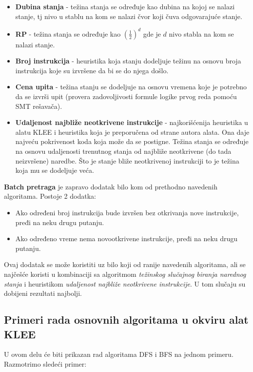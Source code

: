 \documentclass[12pt]{article}
\begin{document}
\begin{itemize}
    \item\textbf{Dubina stanja} - težina stanja se određuje kao dubina na kojoj se nalazi stanje, tj nivo u stablu na kom se nalazi čvor koji čuva odgovarajuće stanje.
    
    \item\textbf{RP} - težina stanja se određuje kao $(\frac{1}{2}) ^ d$ gde je $d$ nivo stabla na kom se nalazi stanje.
    
    \item\textbf{Broj instrukcija} - heuristika koja stanju dodeljuje težinu na osnovu broja instrukcija koje su izvršene da bi se do njega došlo.
    
    \item\textbf{Cena upita} - težina stanju se dodeljuje na osnovu vremena koje je potrebno da se izvrši upit (provera zadovoljivosti formule logike prvog reda pomoću SMT rešavača).
    
    \item\textbf{Udaljenost najbliže neotkrivene instrukcije} - najkorišćenija heuristika u alatu KLEE i heuristika koja je preporučena od strane autora alata. Ona daje najveću pokrivenost koda koja može da se postigne. Težina stanja se određuje na osnovu udaljenosti trenutnog stanja od najbliže neotkrivene (do tada neizvršene) naredbe. Što je stanje bliže neotkrivenoj instrukciji to je težina koja mu se dodeljuje veća. 
\end{itemize}

\bigskip

\textbf{Batch pretraga} je zapravo dodatak bilo kom od prethodno navedenih algoritama. Postoje 2 dodatka:
\begin{itemize}
    \item Ako određeni broj instrukcija bude izvršen bez otkrivanja nove instrukcije, pređi na neku drugu putanju.
    
    \item Ako određeno vreme nema novootkrivene instrukcije, pređi na neku drugu putanju.
\end{itemize}
Ovaj dodatak se može koristiti uz bilo koji od ranije navedenih algoritama, ali se najčešće koristi u kombinaciji sa algoritmom \textit{težinskog slučajnog biranja narednog stanja} i heuristikom \textit{udaljenost najbliže neotkrivene instrukcije}. U tom slučaju su dobijeni rezultati najbolji.
\newpage
\subsection{Primeri rada osnovnih algoritama u okviru alat KLEE}
U ovom delu će biti prikazan rad algoritama DFS i BFS na jednom primeru. Razmotrimo sledeći primer:
\end{document}
